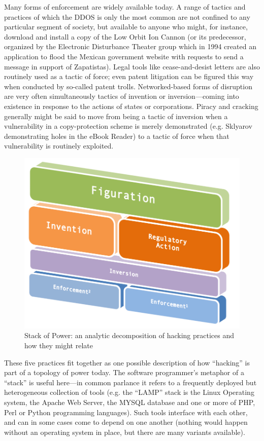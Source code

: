 \documentclass[10pt,letter,oneside]{scrartcl}
\begin{document}
Many forms of enforcement are widely available today.  A range of tactics and
practices of which the DDOS is only the most common are not confined to any
particular segment of society, but available to anyone who might, for instance,
download and install a copy of the Low Orbit Ion Cannon (or its predecessor,
organized by the Electronic Disturbance Theater group which in 1994 created an
application to flood the Mexican government website with requests to send a
message in support of Zapatistas).  Legal tools like cease-and-desist letters
are also routinely used as a tactic of force; even patent litigation can be
figured this way when conducted by so-called patent trolls.  Networked-based
forms of disruption are very often simultaneously tactics of invention or
inversion—coming into existence in response to the actions of states or
corporations.  Piracy and cracking generally might be said to move from being a
tactic of inversion when a vulnerability in a copy-protection scheme is merely
demonstrated (e.g. Sklyarov demonstrating holes in the eBook Reader) to a tactic
of force when that vulnerability is routinely exploited.

\begin{figure} \centering \includegraphics[scale=0.5]{images/protocolstackV2}
\caption{Stack of Power: an analytic decomposition of hacking
practices and how they might relate} \label{fig:ProtocolStack} \end{figure}

These five practices fit together as one possible description of how ``hacking''
is part of a topology of power today.  The software programmer's metaphor
of a ``stack'' is useful here---in common parlance it refers to a frequently
deployed but heterogeneous collection of tools (e.g. the ``LAMP'' stack is the Linux
Operating system, the Apache Web Server, the MYSQL database and one or more of
PHP, Perl or Python programming languages).  Such tools interface with each
other, and can in some cases come to depend on one another (nothing would happen
without an operating system in place, but there are many variants available).
\end{document}
